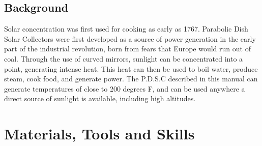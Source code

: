 \documentclass{article}
\begin{document}
        \subsection{Background}
            Solar concentration was first used for cooking as early as 1767.  Parabolic Dish Solar Collectors were first developed 
            as a source of power generation in the early part of the industrial revolution, born from fears that Europe would run 
            out of coal.  Through the use of curved mirrors, sunlight can be concentrated into a point, generating intense heat.  
            This heat can then be used to boil water, produce steam, cook food, and generate power.  The P.D.S.C described in this 
            manual can generate temperatures of close to 200 degrees F, and can be used anywhere a direct source of sunlight is 
            available, including high altitudes.
        
    
    \section{Materials, Tools and Skills}
\end{document}
